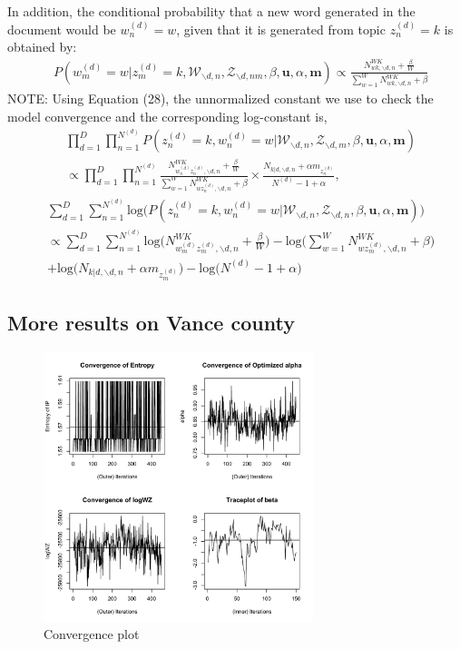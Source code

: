 \documentclass[a4paper]{article}
\begin{document}
  In addition, the conditional probability that a new word generated in the document would be $w_n^{(d)}=w$, given that it is generated from topic $z_n^{(d)}=k$ is obtained by:
  \begin{equation}
  \begin{aligned}
  & P(w^{(d)}_m=w|z^{(d)}_m=k, \mathcal{W}_{\backslash d, n}, \mathcal{Z}_{\backslash d, nm}, \beta, \boldsymbol{u}, \alpha, \boldsymbol{m}) \propto 
  \frac{N_{wk, \backslash d, n}^{WK}+\frac{\beta}{W}}{\sum_{w=1}^WN_{wk, \backslash d, n}^{WK}+\beta}
  \end{aligned} 
  \end{equation}
  NOTE: Using Equation (28), the unnormalized constant we use to check the model convergence and the corresponding log-constant is,
  \begin{equation}
  \begin{aligned}
  & \prod_{d=1}^{D}\prod_{n=1}^{N^{(d)}}  P(z^{(d)}_n=k, w^{(d)}_n=w|\mathcal{W}_{\backslash d, n}, \mathcal{Z}_{\backslash d,m}, \beta, \boldsymbol{u}, \alpha, \boldsymbol{m}) \\ & \propto \prod_{d=1}^{D}\prod_{n=1}^{N^{(d)}} 
  \frac{N_{w^{(d)}_nz^{(d)}_n, \backslash d, n}^{WK}+\frac{\beta}{W}}{\sum_{w=1}^WN_{wz^{(d)}_n,  \backslash d, n}^{WK}+\beta}\times\frac{N_{k|d, \backslash d, n}+\alpha m_{z^{(d)}_n}}{N^{(d)}-1+\alpha},
  \end{aligned}
  \end{equation}
  \begin{equation}
  \begin{aligned}
  & \sum_{d=1}^{D}\sum_{n=1}^{N^{(d)}} \mbox{log}\Big( P(z^{(d)}_n=k, w^{(d)}_n=w|\mathcal{W}_{\backslash d, n}, \mathcal{Z}_{\backslash d, n}, \beta, \boldsymbol{u}, \alpha, \boldsymbol{m})\Big) \\ & \propto \sum_{d=1}^{D}\sum_{n=1}^{N^{(d)}} 
  \mbox{log}\Big(N_{w^{(d)}_mz^{(d)}_m, \backslash d, n}^{WK}+\frac{\beta}{W}\Big)-\mbox{log}\Big(\sum_{w=1}^WN_{wz^{(d)}_m,  \backslash d, n}^{WK}+\beta\Big)\\&+\mbox{log}\Big(N_{k|d, \backslash d, n}+\alpha m_{z^{(d)}_m}\Big)-\mbox{log}\Big(N^{(d)}-1+\alpha\Big)
  \end{aligned}
  \end{equation}
  \subsection{More results on Vance county}
 \begin{figure}[ht]
 	\centering
 	\includegraphics[width=0.7\textwidth]{convergence500.pdf} 
 	\caption{Convergence plot}
 	\label{fig:Convergence plot}
 \end{figure}
\end{document}
